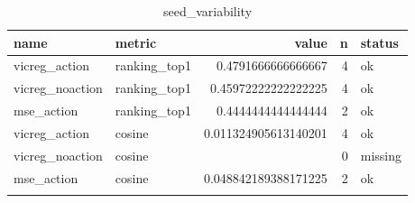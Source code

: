 \begin{table}
\centering
\begin{tabular}{llrrl}
name & metric & value & n & status \\
\hline
vicreg\_action & ranking\_top1 & 0.4791666666666667 & 4 & ok \\
vicreg\_noaction & ranking\_top1 & 0.45972222222222225 & 4 & ok \\
mse\_action & ranking\_top1 & 0.4444444444444444 & 2 & ok \\
vicreg\_action & cosine & 0.011324905613140201 & 4 & ok \\
vicreg\_noaction & cosine &  & 0 & missing \\
mse\_action & cosine & 0.048842189388171225 & 2 & ok \\
\caption{seed\_variability}
\end{tabular}
\end{table}
